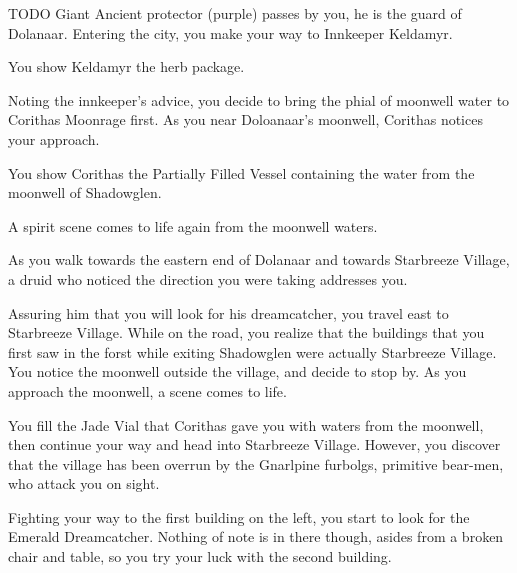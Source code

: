 TODO Giant Ancient protector (purple) passes by you, he is the guard of Dolanaar. Entering the city, you make your way to Innkeeper Keldamyr.


You show Keldamyr the herb package.


Noting the innkeeper's advice, you decide to bring the phial of moonwell water to Corithas Moonrage first. As you near Doloanaar's moonwell, Corithas notices your approach.


You show Corithas the Partially Filled Vessel containing the water from the moonwell of Shadowglen.


A spirit scene comes to life again from the moonwell waters.



As you walk towards the eastern end of Dolanaar and towards Starbreeze Village, a druid who noticed the direction you were taking addresses you.


Assuring him that you will look for his dreamcatcher, you travel east to Starbreeze Village. While on the road, you realize that the buildings that you first saw in the forst while exiting Shadowglen were actually Starbreeze Village. You notice the moonwell outside the village, and decide to stop by. As you approach the moonwell, a scene comes to life.


You fill the Jade Vial that Corithas gave you with waters from the moonwell, then continue your way and head into Starbreeze Village. However, you discover that the village has been overrun by the Gnarlpine furbolgs, primitive bear-men, who attack you on sight.


Fighting your way to the first building on the left, you start to look for the Emerald Dreamcatcher. Nothing of note is in there though, asides from a broken chair and table, so you try your luck with the second building.


